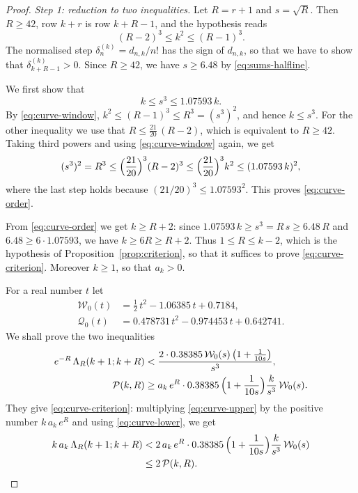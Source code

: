 \documentclass{amsart}
\theoremstyle{definition}
\theoremstyle{remark}
\numberwithin{equation}{section}
\begin{document}
\begin{proof}
\emph{Step 1: reduction to two inequalities.}
Let $R=r+1$ and $s=\sqrt R$. Then $R\ge42$, row $k+r$ is row
$k+R-1$, and the hypothesis reads
\begin{equation}\label{eq:curve-window}
(R-2)^3\le k^2\le(R-1)^3 .
\end{equation}
The normalised step $\delta^{(k)}_n=d_{n,k}/n!$ has the sign of $d_{n,k}$,
so that we have to show that $\delta^{(k)}_{k+R-1}>0$. Since $R\ge42$,
we have $s\ge6.48$ by \eqref{eq:sums-halfline}.

We first show that
\begin{equation}\label{eq:curve-order}
k\le s^3\le1.07593\,k .
\end{equation}
By \eqref{eq:curve-window}, $k^2\le(R-1)^3\le R^3=(s^3)^2$, and hence
$k\le s^3$. For the other inequality we use that
$R\le\frac{21}{20}\,(R-2)$, which is equivalent to $R\ge42$. Taking third
powers and using \eqref{eq:curve-window} again, we get
\[
(s^3)^2=R^3\le\Bigl(\frac{21}{20}\Bigr)^3(R-2)^3
\le\Bigl(\frac{21}{20}\Bigr)^3k^2\le(1.07593\,k)^2,
\]
where the last step holds because $(21/20)^3\le1.07593^2$. This proves
\eqref{eq:curve-order}.

From \eqref{eq:curve-order} we get $k\ge R+2$: since
$1.07593\,k\ge s^3=R\,s\ge6.48\,R$ and $6.48\ge6\cdot1.07593$, we have
$k\ge6R\ge R+2$. Thus $1\le R\le k-2$, which is the hypothesis of
Proposition~\ref{prop:criterion}, so that it suffices to prove
\eqref{eq:curve-criterion}. Moreover $k\ge1$, so that $a_k>0$.

For a real number $t$ let
\begin{equation}\label{eq:curve-polynomials}
\begin{aligned}
\mathcal W_0(t)&=\tfrac12\,t^2-1.06385\,t+0.7184,\\
\mathcal Q_0(t)&=0.478731\,t^2-0.974453\,t+0.642741 .
\end{aligned}
\end{equation}
We shall prove the two inequalities
\begin{align}
e^{-R}\,\Lambda_R(k+1;k+R)&<
\frac{2\cdot0.38385\,\mathcal W_0(s)\,\bigl(1+\frac{1}{10s}\bigr)}{s^3},
\label{eq:curve-upper}\\
\mathcal P(k,R)&\ge a_k\,e^{R}\cdot0.38385\,\Bigl(1+\frac{1}{10s}\Bigr)
\frac{k}{s^3}\,\mathcal W_0(s).
\label{eq:curve-lower}
\end{align}
They give \eqref{eq:curve-criterion}: multiplying \eqref{eq:curve-upper}
by the positive number
$k\,a_k\,e^{R}$ and using \eqref{eq:curve-lower}, we get
\begin{align*}
k\,a_k\,\Lambda_R(k+1;k+R)
&<2\,a_k\,e^{R}\cdot0.38385\,\Bigl(1+\frac{1}{10s}\Bigr)\frac{k}{s^3}\,
\mathcal W_0(s)\\
&\le2\,\mathcal P(k,R).
\end{align*}


\end{proof}
\end{document}
